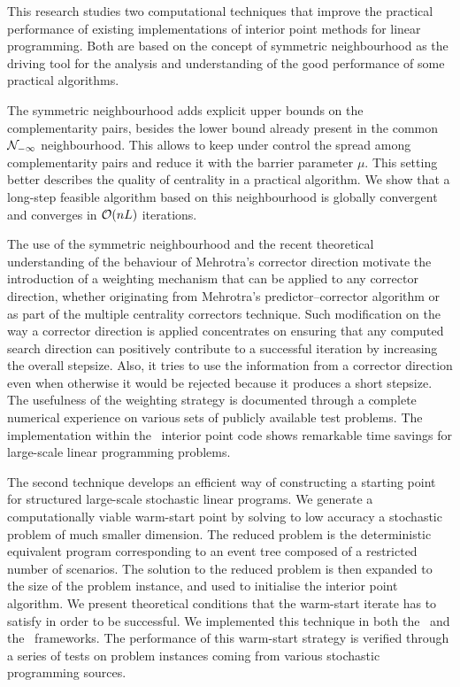 
%
%

This research studies two computational techniques that improve
the practical performance of existing implementations 
of interior point methods for linear programming.
Both are based on the concept of symmetric neighbourhood 
as the driving tool for the analysis and understanding of the good 
performance of some practical algorithms. 

The symmetric neighbourhood adds explicit upper bounds
on the complementarity pairs, besides the lower bound already
present in the common $\mathcal{N}_{-\infty}$ neighbourhood.
This allows to keep under control the spread among 
complementarity pairs and reduce it with the barrier parameter $\mu$.
This setting better describes the quality of centrality 
in a practical algorithm.
We show that a long-step feasible algorithm based on 
this neighbourhood is globally convergent and
converges in $\mathcal{O}(nL)$ iterations.

The use of the symmetric neighbourhood and the recent
theoretical understanding of the behaviour of Mehrotra's
corrector direction motivate the introduction of a weighting
mechanism that can be applied to any corrector direction,
whether originating from Mehrotra's predictor--corrector algorithm
or as part of the multiple centrality correctors technique.
Such modification on the way a corrector direction is applied
concentrates on ensuring that any computed search direction can positively
contribute to a successful iteration by increasing the overall
stepsize. Also, it tries to use the information from a corrector
direction even when otherwise it would be rejected because it
produces a short stepsize. 
The usefulness of the weighting strategy is documented through
a complete numerical experience on various sets of publicly
available test problems.
The implementation within the \HOPDM\ interior point code
shows remarkable time savings for large-scale linear programming problems.

The second technique develops an efficient way of 
constructing a starting point for structured large-scale 
stochastic linear programs.
We generate a computationally viable warm-start point by solving 
to low accuracy a stochastic problem of much smaller dimension.
The reduced problem is the deterministic equivalent program
corresponding to an event tree composed of a restricted number
of scenarios.
The solution to the reduced problem is then expanded to the
size of the problem instance, and used to initialise the
interior point algorithm.
We present theoretical conditions that the warm-start iterate
has to satisfy in order to be successful.
We implemented this technique in both the \HOPDM\ and the \OOPS\
frameworks.
The performance of this warm-start strategy is verified through 
a series of tests on problem instances coming from various stochastic
programming sources.

